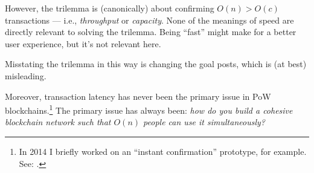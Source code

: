 However, the trilemma is (canonically) about confirming $O(n) > O(c)$ transactions --- i.e., \emph{throughput} or \emph{capacity}.
None of the meanings of speed are directly relevant to solving the trilemma.
Being ``fast'' might make for a better user experience, but it's not relevant here.


Misstating the trilemma in this way is changing the goal posts, which is (at best) misleading.

Moreover, transaction latency has never been the primary issue in PoW blockchains.\footnote{
    In 2014 I briefly worked on an ``instant confirmation'' prototype, for example.
    See: \linkQantaBitcointalk.
}
The primary issue has always been: \emph{how do you build a cohesive blockchain network such that $O(n)$ people can use it simultaneously?}
